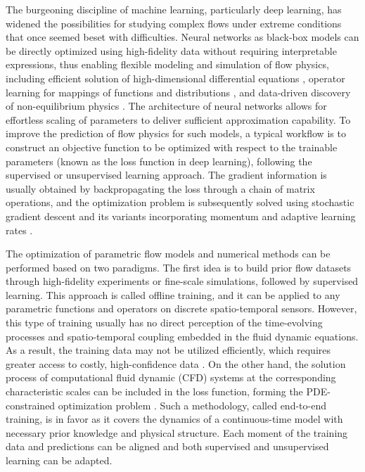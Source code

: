 \documentclass[preprint,3p,12pt,sort&compress]{elsarticle}
\begin{document}
The burgeoning discipline of machine learning, particularly deep learning, has widened the possibilities for studying complex flows under extreme conditions that once seemed beset with difficulties.
Neural networks as black-box models can be directly optimized using high-fidelity data without requiring interpretable expressions, thus enabling flexible modeling and simulation of flow physics, including efficient solution of high-dimensional differential equations \cite{raissi2019physics,han2018solving}, operator learning for mappings of functions and distributions \cite{lu2021learning,li2020fourier}, and data-driven discovery of non-equilibrium physics \cite{floryan2022data,pan2018data}.
The architecture of neural networks allows for effortless scaling of parameters to deliver sufficient approximation capability.
To improve the prediction of flow physics for such models, a typical workflow is to construct an objective function to be optimized with respect to the trainable parameters (known as the loss function in deep learning), following the supervised or unsupervised learning approach.
The gradient information is usually obtained by backpropagating the loss through a chain of matrix operations, and the optimization problem is subsequently solved using stochastic gradient descent and its variants incorporating momentum and adaptive learning rates \cite{goodfellow2016deep}.

The optimization of parametric flow models and numerical methods can be performed based on two paradigms.
The first idea is to build prior flow datasets through high-fidelity experiments or fine-scale simulations, followed by supervised learning.
This approach is called offline training, and it can be applied to any parametric functions and operators on discrete spatio-temporal sensors.
However, this type of training usually has no direct perception of the time-evolving processes and spatio-temporal coupling embedded in the fluid dynamic equations.
As a result, the training data may not be utilized efficiently, which requires greater access to costly, high-confidence data \cite{menghani2023efficient}.
On the other hand, the solution process of computational fluid dynamic (CFD) systems at the corresponding characteristic scales can be included in the loss function, forming the PDE-constrained optimization problem \cite{de2015numerical}.
Such a methodology, called end-to-end training, is in favor as it covers the dynamics of a continuous-time model with necessary prior knowledge and physical structure.
Each moment of the training data and predictions can be aligned and both supervised and unsupervised learning can be adapted.
\end{document}
